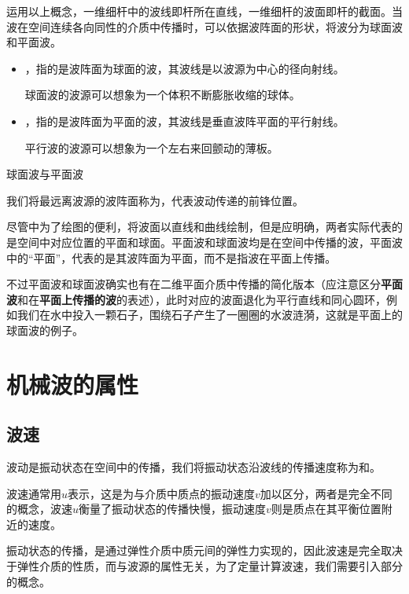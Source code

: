 运用以上概念，一维细杆中的波线即杆所在直线，一维细杆的波面即杆的截面。当波在空间连续各向同性的介质中传播时，可以依据波阵面的形状，将波分为球面波和平面波。
\begin{itemize}
    \item {}，指的是波阵面为球面的波，其波线是以波源为中心的径向射线。
    
    球面波的波源可以想象为一个体积不断膨胀收缩的球体。

    \item {}，指的是波阵面为平面的波，其波线是垂直波阵平面的平行射线。
    
    平行波的波源可以想象为一个左右来回颤动的薄板。
\end{itemize}
\begin{Figure}{球面波与平面波}
    \qquad
\end{Figure}

我们将最远离波源的波阵面称为，代表波动传递的前锋位置。

尽管中为了绘图的便利，将波面以直线和曲线绘制，但是应明确，两者实际代表的是空间中对应位置的平面和球面。平面波和球面波均是在空间中传播的波，平面波中的“平面”，代表的是其波阵面为平面，而不是指波在平面上传播。

不过平面波和球面波确实也有在二维平面介质中传播的简化版本（应注意区分\textbf{平面波}和在\textbf{平面上传播的波}的表述），此时对应的波面退化为平行直线和同心圆环，例如我们在水中投入一颗石子，围绕石子产生了一圈圈的水波涟漪，这就是平面上的球面波的例子。

\section{机械波的属性}

\subsection{波速}
波动是振动状态在空间中的传播，我们将振动状态沿波线的传播速度称为和。

波速通常用$u$表示，这是为与介质中质点的振动速度$v$加以区分，两者是完全不同的概念，波速$u$衡量了振动状态的传播快慢，振动速度$v$则是质点在其平衡位置附近的速度。

振动状态的传播，是通过弹性介质中质元间的弹性力实现的，因此波速是完全取决于弹性介质的性质，而与波源的属性无关，为了定量计算波速，我们需要引入部分的概念。

